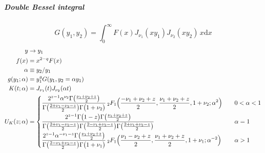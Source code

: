 \documentclass{article}
\renewcommand{\d}{\mathrm{d}}
\newcommand{\Mellin}{U}
\begin{document}
\subparagraph{Double Bessel integral}
\begin{equation}
    G(y_1, y_2) = \int_0^\infty F(x) J_{\nu_1}(xy_1) J_{\nu_2}(xy_2) \,x\d x
\end{equation}
\begin{align}
    y &\to y_1 \\
    f(x) &= x^{2-q} F(x) \\
    \alpha &\equiv y_2/y_1 \\
    g(y_1; \alpha) &= y_1^q G(y_1, y_2 = \alpha y_1) \\
    K(t; \alpha) &= J_{\nu_1}(t) J_{\nu_2}(\alpha t) \\
    \Mellin_K(z; \alpha) &=
    \begin{cases}
        \displaystyle
        \frac{2^{z-1} \alpha^{\nu_2} \Gamma\bigl(\frac{\nu_1+\nu_2+z}2\bigr)}
            {\Gamma\bigl(\frac{2+\nu_1-\nu_2-z}2\bigr) \Gamma\bigl(1+\nu_2\bigr)}
        \,_2F_1\Bigl( \frac{-\nu_1+\nu_2+z}2, \frac{\nu_1+\nu_2+z}2, 1+\nu_2; \alpha^2 \Bigr)
        & \quad 0<\alpha<1 \\[1em]
        \displaystyle
        \frac{2^{z-1} \Gamma\bigl(1-z\bigr) \Gamma\bigl(\frac{\nu_1+\nu_2+z}2\bigr)}
            {\Gamma\bigl(\frac{2+\nu_1-\nu_2-z}2\bigr) \Gamma\bigl(\frac{2-\nu_1+\nu_2-z}2\bigr)
                \Gamma\bigl(\frac{2+\nu_1+\nu_2-z}2\bigr)}
        & \quad \alpha=1 \\[1em]
        \displaystyle
        \frac{2^{z-1} \alpha^{-\nu_1-z} \Gamma\bigl(\frac{\nu_1+\nu_2+z}2\bigr)}
            {\Gamma\bigl(\frac{2-\nu_1+\nu_2-z}2\bigr) \Gamma\bigl(1+\nu_1\bigr)}
        \,_2F_1\Bigl( \frac{\nu_1-\nu_2+z}2, \frac{\nu_1+\nu_2+z}2, 1+\nu_1; \alpha^{-2} \Bigr)
        & \quad \alpha>1
    \end{cases}
\end{align}
\end{document}
